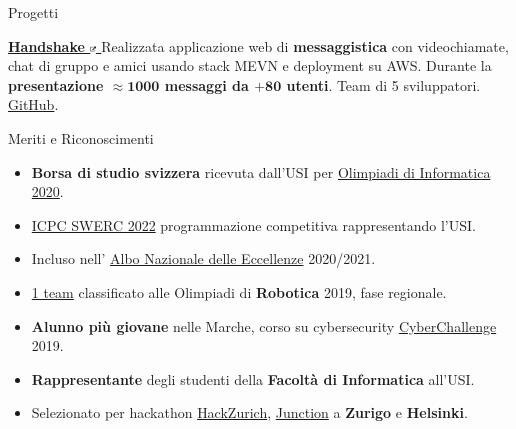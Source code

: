 \documentclass{cv} %
\def\intraexpvspace{0.15cm}
\begin{document}
\begin{minipage}[b][0.9\paperheight][t]{0.7\linewidth}
\begin{rSection}{Progetti}
        \vspace{\intraexpvspace}
        \item \textbf{\href{https://handshakeapp.ch}{
                Handshake
                \includegraphics[width=0.15cm, trim={10cm -10cm 0cm 0cm}]{ext-link-icon.png}
            }}
        {Realizzata applicazione web di \textbf{messaggistica} con videochiamate, chat di gruppo e amici
            usando stack MEVN e deployment su AWS.
            Durante la \textbf{presentazione $\boldsymbol{\approx1000}$ messaggi da $\boldsymbol{+ 80}$ utenti}.
            Team di 5 sviluppatori.
            \href{https://github.com/ogs-at-usi/handshake}{GitHub}.
        }
    \end{rSection}
    \begin{rSection}{Meriti e Riconoscimenti}
        \vspace{0.2cm}
        \begin{itemize}[leftmargin=*]
            \itemsep 0.2em
            \item \textbf{Borsa di studio svizzera} ricevuta dall'USI per
                  \href{https://www.olimpiadi-informatica.it/index.php/selezione-territoriale-20.html}{Olimpiadi di Informatica 2020}.

            \item \href{https://icpc.global/ICPCID/ZOI3HF9XDUH8}{ICPC SWERC 2022}
                  programmazione competitiva rappresentando l'USI.

            \item Incluso nell' \href{https://www.indire.it/eccellenze/}{Albo Nazionale delle Eccellenze} 2020/2021.

            \item \href{https://www.makerslab.it/olimpiadi-robotiche-ancona-2019/}{1 team}
                  classificato alle Olimpiadi di \textbf{Robotica} 2019, fase regionale. %

            \item \textbf{Alunno più giovane} nelle Marche, corso su cybersecurity
                  \href{https://cyberchallenge.it/}{CyberChallenge} 2019.

            \item \textbf{Rappresentante} degli studenti della \textbf{Facoltà di Informatica} all'USI.

            \item Selezionato per hackathon \href{https://hackzurich.com/}{HackZurich},
                  \href{https://www.junction2023.com/}{Junction}
                  a \textbf{Zurigo} e \textbf{Helsinki}.
        \end{itemize}
    \end{rSection}

\end{minipage}
\end{document}
